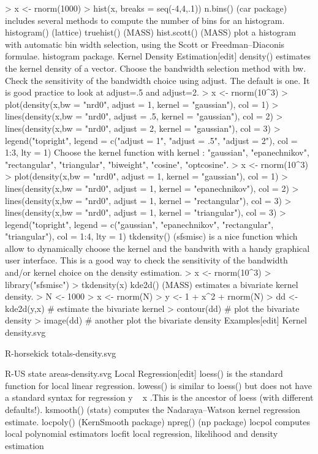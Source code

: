 > x <- rnorm(1000)
> hist(x, breaks = seq(-4,4,.1))
n.bins() (car package) includes several methods to compute the number of bins for an histogram.
histogram() (lattice)
truehist() (MASS)
hist.scott() (MASS) plot a histogram with automatic bin width selection, using the Scott or Freedman–Diaconis formulae.
histogram package.
Kernel Density Estimation[edit]
density() estimates the kernel density of a vector.
Choose the bandwidth selection method with bw.
Check the sensitivity of the bandwidth choice using adjust. The default is one. It is good practice to look at adjust=.5 and adjust=2.
> x <- rnorm(10^3)
> plot(density(x,bw = "nrd0", adjust = 1, kernel = "gaussian"), col = 1)
> lines(density(x,bw = "nrd0", adjust = .5, kernel = "gaussian"), col = 2)
> lines(density(x,bw = "nrd0", adjust = 2, kernel = "gaussian"), col = 3)
> legend("topright", legend = c("adjust = 1", "adjust = .5", "adjust = 2"), col = 1:3, lty = 1)
Choose the kernel function with kernel : "gaussian", "epanechnikov", "rectangular", "triangular", "biweight", "cosine", "optcosine".
> x <- rnorm(10^3)
> plot(density(x,bw = "nrd0", adjust = 1, kernel = "gaussian"), col = 1)
> lines(density(x,bw = "nrd0", adjust = 1, kernel = "epanechnikov"), col = 2)
> lines(density(x,bw = "nrd0", adjust = 1, kernel = "rectangular"), col = 3)
> lines(density(x,bw = "nrd0", adjust = 1, kernel = "triangular"), col = 3)
> legend("topright", legend = c("gaussian", "epanechnikov", "rectangular",  "triangular"), col = 1:4, lty = 1)
tkdensity() (sfsmisc) is a nice function which allow to dynamically choose the kernel and the bandwith with a handy graphical user interface. This is a good way to check the sensitivity of the bandwidth and/or kernel choice on the density estimation.
> x  <- rnorm(10^3)
> library("sfsmisc")
> tkdensity(x)
kde2d() (MASS) estimates a bivariate kernel density.
> N <- 1000
> x <- rnorm(N)
> y <- 1 + x^2 + rnorm(N)
> dd <-  kde2d(y,x) # estimate the bivariate kernel
> contour(dd) # plot the bivariate density
> image(dd) # another plot the bivariate density
Examples[edit]
Kernel density.svg
 
R-horsekick totals-density.svg
 
R-US state areas-density.svg
Local Regression[edit]
loess() is the standard function for local linear regression.
lowess() is similar to loess() but does not have a standard syntax for regression y ~ x .This is the ancestor of loess (with different defaults!).
ksmooth() (stats) computes the Nadaraya–Watson kernel regression estimate.
locpoly() (KernSmooth package)
npreg() (np package)
locpol computes local polynomial estimators
locfit local regression, likelihood and density estimation


